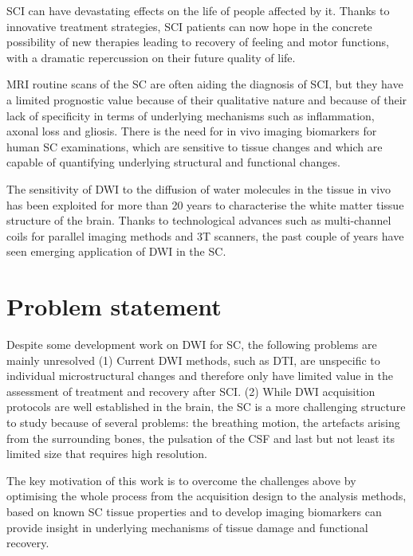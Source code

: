 {\Gls{SCI}} can have devastating effects on the life of people affected by it. Thanks to innovative treatment strategies, {\gls{SCI}} patients can now hope in the concrete possibility of new therapies leading to recovery of feeling and motor functions, with a dramatic repercussion on their future quality of life.

{\gls{MRI}} routine scans of the {\gls{SC}} are often aiding the diagnosis of {\gls{SCI}}, but they have a limited prognostic value because of their qualitative nature and because of their lack of specificity in terms of underlying mechanisms such as inflammation, axonal loss and gliosis. There is the need for in vivo imaging biomarkers for human {\gls{SC}} examinations, which are sensitive to tissue changes and which are capable of quantifying underlying structural and functional changes.

The sensitivity of {\gls{DWI}} to the diffusion of water molecules in the tissue in vivo has been exploited for more than 20 years to characterise the white matter tissue structure of the brain. Thanks to technological advances such as multi-channel coils for parallel imaging methods and 3T scanners, the past couple of years have seen emerging application of \gls{DWI} in the {\gls{SC}}.

\section{Problem statement}
Despite some development work on \gls{DWI} for \gls{SC}, the following problems are mainly unresolved (1) Current \gls{DWI} methods, such as \gls{DTI}, are unspecific to individual microstructural changes and therefore only have limited value in the assessment of treatment and recovery after \gls{SCI}. (2) While \gls{DWI} acquisition protocols are well established in the brain, the \gls{SC} is a more challenging structure to study because of several problems: the breathing motion, the artefacts arising from the surrounding bones, the pulsation of the {\gls{CSF}} and last but not least its limited size that requires high resolution.  

The key motivation of this work is to overcome the challenges above by optimising the whole process from the acquisition design to the analysis methods, based on known \gls{SC} tissue properties and to develop imaging biomarkers can provide insight in underlying mechanisms of tissue damage and functional recovery.

